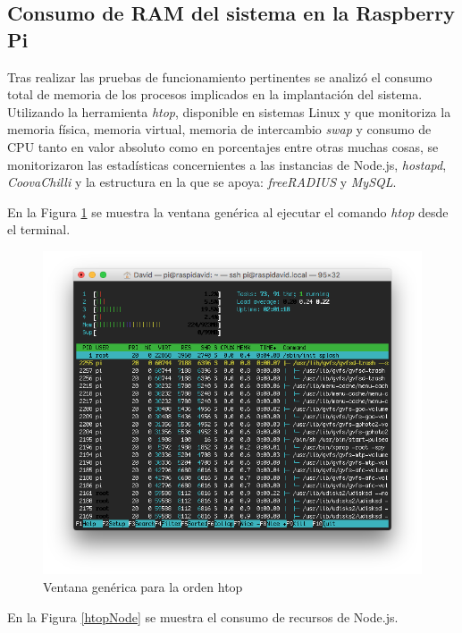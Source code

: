 \subsection{Consumo de RAM del sistema en la Raspberry Pi}

Tras realizar las pruebas de funcionamiento pertinentes se analizó el consumo total de memoria de los procesos implicados en la implantación del sistema. Utilizando la herramienta \emph{htop}, disponible en sistemas Linux y que monitoriza la memoria física, memoria virtual, memoria de intercambio \emph{swap} y consumo de CPU tanto en valor absoluto como en porcentajes entre otras muchas cosas, se monitorizaron las estadísticas concernientes a las instancias de Node.js, \emph{hostapd}, \emph{CoovaChilli} y la estructura en la que se apoya: \emph{freeRADIUS} y \emph{MySQL}.

En la Figura \ref{htopGeneric} se muestra la ventana genérica al ejecutar el comando \emph{htop} desde el terminal.

\begin{figure}[!t]
\begin{center}
\includegraphics[width=0.75\linewidth]{./6_EvalEmpirica/Img/htopGeneric.png}
\end{center}
\caption{Ventana genérica para la orden htop}
\label{htopGeneric}
\end{figure}

En la Figura \ref{htopNode} se muestra el consumo de recursos de Node.js.

